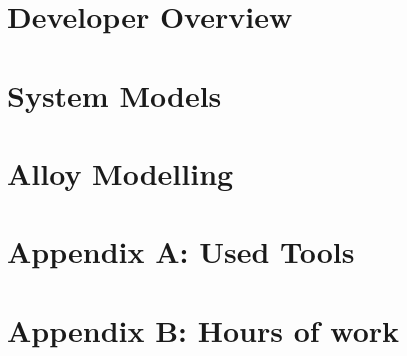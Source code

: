 \documentclass[openright]{report}
\begin{document}
	\chapter{Developer Overview}
		
	\chapter{System Models}
		
	\chapter{Alloy Modelling}
		




    \appendix
    \newpage
    \chapter{Appendix A: Used Tools}
	    

	\newpage
	\chapter{Appendix B: Hours of work}
	    


	
	\glsaddall
	\printglossaries

	\newpage
	\begin{thebibliography}{10}
		
	\end{thebibliography}
\end{document}
